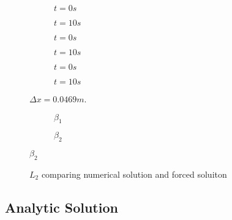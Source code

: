 \documentclass[10pt]{article}
\begin{document}
\begin{figure}
	\centering
	\begin{subfigure}{0.49\textwidth}
		\centering
		
		\caption{$t = 0s$}
	\end{subfigure}
	\begin{subfigure}{0.49\textwidth}
		\centering
		
		\caption{$t = 10s$}
	\end{subfigure}
	\begin{subfigure}{0.49\textwidth}
		\centering
		
		\caption{$t = 0s$}
	\end{subfigure}
	\begin{subfigure}{0.49\textwidth}
		\centering
		
		\caption{$t = 10s$}
	\end{subfigure}
	\begin{subfigure}{0.49\textwidth}
		\centering
		
		\caption{$t = 0s$}
	\end{subfigure}
	\begin{subfigure}{0.49\textwidth}
		\centering
		
		\caption{$t = 10s$}
	\end{subfigure}
	\caption{$\Delta x = 0.0469 m$. }
\end{figure}
\begin{figure}
	\centering
	\begin{subfigure}{0.49\textwidth}
		\centering
		
		\caption{$\beta_1$}
	\end{subfigure}
	\begin{subfigure}{0.49\textwidth}
		\centering
		
		\caption{$\beta_2$}
	\end{subfigure}
\end{figure}

\begin{figure}
	\centering
	
	\caption{$L_2$ comparing numerical solution and forced soluiton}
\end{figure}


\subsection{Analytic Solution}
\end{document}

